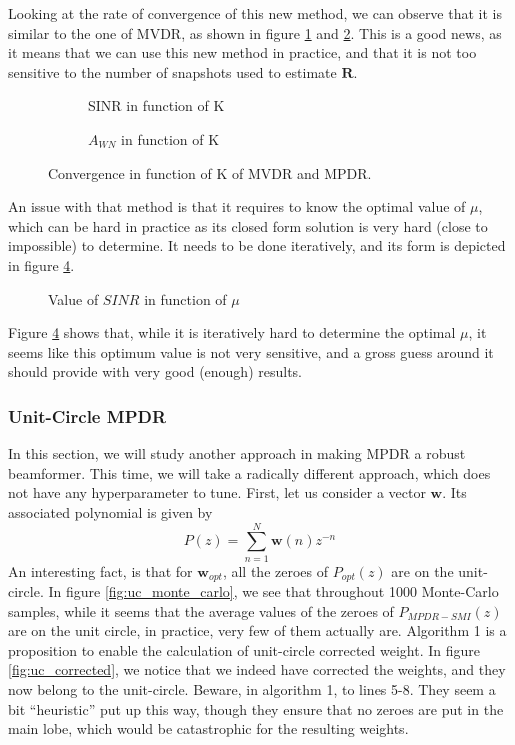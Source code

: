 \documentclass[12pt]{article}
\begin{document}
Looking at the rate of convergence of this new method, we can observe that it is similar to the one of MVDR, as shown in figure \ref{fig:robust_k_sinr} and \ref{fig:robust_k_awn}. This is a good news, as it means that we can use this new method in practice, and that it is not too sensitive to the number of snapshots used to estimate $\mathbf{R}$.
\begin{figure}[H]
    \centering
    \begin{subfigure}[b]{0.4\linewidth}
        
        \caption{SINR in function of K}
        \label{fig:robust_k_sinr}
    \end{subfigure}\hspace{0.09\linewidth}
    \begin{subfigure}[b]{0.4\linewidth}
        
        \caption{$A_{WN}$ in function of K}
        \label{fig:robust_k_awn}
    \end{subfigure}
    \caption{Convergence in function of K of MVDR and MPDR.}
    \label{fig:mpdr_robust_k}
\end{figure}
An issue with that method is that it requires to know the optimal value of $\mu$, which can be hard in practice as its closed form solution is very hard (close to impossible) to determine. It needs to be done iteratively, and its form is depicted in figure \ref{fig:mu}. 
\begin{figure}[H]
    \centering
    
    \caption{Value of $SINR$ in function of $\mu$}
    \label{fig:mu}
\end{figure}
Figure \ref{fig:mu} shows that, while it is iteratively hard to determine the optimal $\mu$, it seems like this optimum value is not very sensitive, and a gross guess around it should provide with very good (enough) results. 
\subsubsection{Unit-Circle MPDR}
In this section, we will study another approach in making MPDR a robust beamformer. This time, we will take a radically different approach, which does not have any hyperparameter to tune. First, let us consider a vector $\mathbf{w}$. Its associated polynomial is given by
\begin{equation}
    P(z)=\sum_{n=1}^N \mathbf{w}(n)z^{-n}
\end{equation}
An interesting fact, is that for $\mathbf{w}_{opt}$, all the zeroes of $P_{opt}(z)$ are on the unit-circle. In figure \ref{fig:uc_monte_carlo}, we see that throughout 1000 Monte-Carlo samples, while it seems that the average values of the zeroes of $P_{MPDR-SMI}(z)$ are on the unit circle, in practice, very few of them actually are. Algorithm 1 is a proposition to enable the calculation of unit-circle corrected weight. In figure \ref{fig:uc_corrected}, we notice that we indeed have corrected the weights, and they now belong to the unit-circle. Beware, in algorithm 1, to lines 5-8. They seem a bit ``heuristic'' put up this way, though they ensure that no zeroes are put in the main lobe, which would be catastrophic for the resulting weights.
\end{document}

